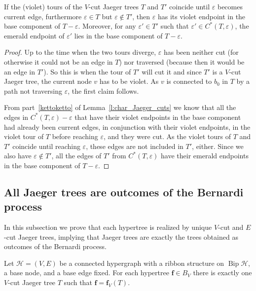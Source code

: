 \documentclass[ALCO,ThmDefs,Unicode,epreuves]{cedram}
\newcommand{\HH}{\mathcal H}
\DeclareMathOperator{\bip}{Bip}
\begin{document}
\begin{lemma} \label{l:subs_trees_cuts}
If the (violet) tours of the $V$-cut Jaeger trees $T$ and $T'$ coincide until $\varepsilon$ becomes current edge, furthermore $\varepsilon\in T$ but $\varepsilon\notin T'$, then $\varepsilon$ has its violet endpoint in the base component of $T-\varepsilon$. Moreover, for any $\varepsilon'\in T'$ such that $\varepsilon'\in C^*(T,\varepsilon)$, the emerald endpoint of $\varepsilon'$ lies in the base component of $T-\varepsilon$.	
\end{lemma}

\begin{proof}
Up to the time when the two tours diverge, $\varepsilon$ has been neither cut (for otherwise it could not be an edge in $T$) nor traversed (because then it would be an edge in $T'$). So this is when the tour of $T'$ will cut it and since $T'$ is a $V$-cut Jaeger tree, the current node $v$ has to be violet. As $v$ is connected to $b_0$ in $T$ by a path not traversing $\varepsilon$, the first claim follows.

From part~\ref{kettoketto} of Lemma~\ref{l:char_Jaeger_cuts} we know that all the edges in $C^*(T,\varepsilon)-\varepsilon$ that have their violet endpoints in the base component had already been current edges, in conjunction with their violet endpoints, in the violet tour of $T$ before reaching $\varepsilon$, and they were cut. As the violet tours of $T$ and $T'$ coincide until reaching $\varepsilon$, these edges are not included in $T'$, either. Since we also have $\varepsilon\notin T'$, all the edges of $T'$ from $C^*(T,\varepsilon)$ have their emerald endpoints in the base component of $T-\varepsilon$.
\end{proof}


\subsection{All Jaeger trees are outcomes of the Bernardi process}
\label{ssec:Jaeger->Bernardi}

In this subsection we prove that each hypertree is realized by unique $V$-cut and $E$-cut Jaeger trees, implying that Jaeger trees are exactly the trees obtained as outcomes of the Bernardi process.

\begin{theo}
\label{t:hypertrees_unique_repr_by_J_trees}
Let $\HH=(V,E)$ be a connected hypergraph with a ribbon structure on $\bip\HH$, a base node, and a base edge fixed. For each hypertree $\mathbf f\in B_V$ there is exactly one $V$-cut Jaeger tree $T$ such that $\mathbf f=\mathbf f_V(T)$.
\end{theo}
\end{document}

